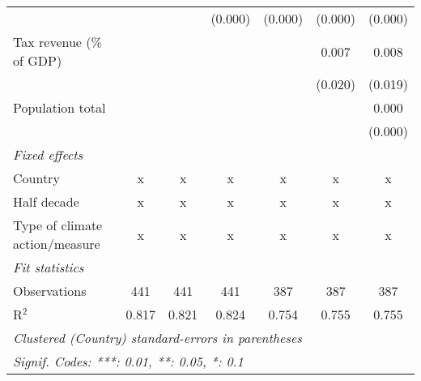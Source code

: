 \begin{tabular}{lcccccc}
                                                                                    &               &               & (0.000)       & (0.000)      & (0.000)      & (0.000)\\   
   Tax revenue (\% of GDP)                                                          &               &               &               &              & 0.007        & 0.008\\   
                                                                                    &               &               &               &              & (0.020)      & (0.019)\\   
   Population total                                                                 &               &               &               &              &              & 0.000\\   
                                                                                    &               &               &               &              &              & (0.000)\\   
   \emph{Fixed effects}\\
   Country                                                                          & x             & x             & x             & x            & x            & x\\  
   Half decade                                                                      & x             & x             & x             & x            & x            & x\\  
   Type of climate action/measure                                                   & x             & x             & x             & x            & x            & x\\  
   \midrule \emph{Fit statistics}\\
   Observations                                                                     & 441           & 441           & 441           & 387          & 387          & 387\\  
   R$^2$                                                                            & 0.817         & 0.821         & 0.824         & 0.754        & 0.755        & 0.755\\  
   \midrule
   \multicolumn{7}{l}{\emph{Clustered (Country) standard-errors in parentheses}}\\
   \multicolumn{7}{l}{\emph{Signif. Codes: ***: 0.01, **: 0.05, *: 0.1}}\\
\end{tabular}
\par\endgroup


